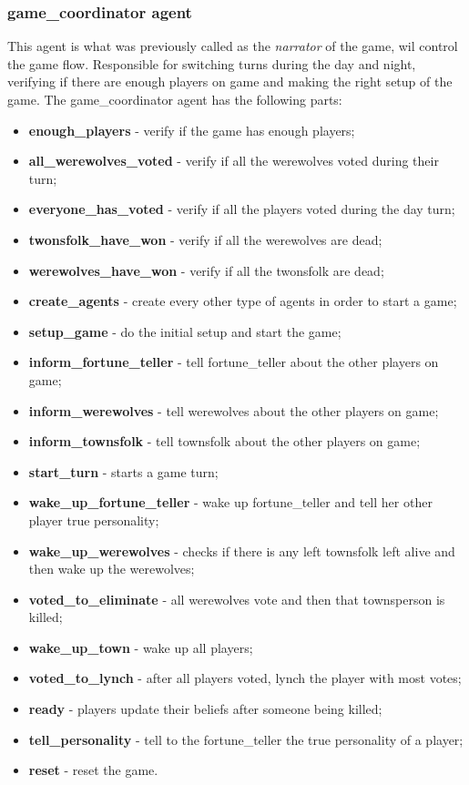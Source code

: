 \documentclass{article}
\begin{document}
\subsubsection{game\_coordinator agent}
This agent is what was previously called as the \textit{narrator} of the game, wil control the game flow. Responsible for switching turns during the day and night, verifying if there are enough players on game and making the right setup of the game. 
The game\_coordinator agent has the following parts:
\begin{itemize}
	\item \textbf{enough\_players} - verify if the game has enough players;
	\item \textbf{all\_werewolves\_voted} - verify if all the werewolves voted during their turn;
	\item \textbf{everyone\_has\_voted} - verify if all the players voted during the day turn;
	\item \textbf{twonsfolk\_have\_won} - verify if all the werewolves are dead;
	\item \textbf{werewolves\_have\_won} - verify if all the twonsfolk are dead;
	\item \textbf{create\_agents} - create every other type of agents in order to start a game;
	\item \textbf{setup\_game} -  do the initial setup and start the game;
	\item \textbf{inform\_fortune\_teller} - tell fortune\_teller about the other players on game;
	\item \textbf{inform\_werewolves} - tell werewolves about the other players on game;
	\item \textbf{inform\_townsfolk} - tell townsfolk about the other players on game;
	\item \textbf{start\_turn} - starts a game turn;
	\item \textbf{wake\_up\_fortune\_teller} - wake up fortune\_teller and tell her other player true personality;
	\item \textbf{wake\_up\_werewolves} - checks if there is any left townsfolk left alive and then wake up the werewolves;
	\item \textbf{voted\_to\_eliminate} - all werewolves vote and then that townsperson is killed;
	\item \textbf{wake\_up\_town} - wake up all players;
	\item \textbf{voted\_to\_lynch} - after all players voted, lynch the player with most votes;
	\item \textbf{ready} - players update their beliefs after someone being killed;
	\item \textbf{tell\_personality} - tell to the fortune\_teller the true personality of a player;
	\item \textbf{reset} - reset the game.
\end{itemize} 
\end{document}
